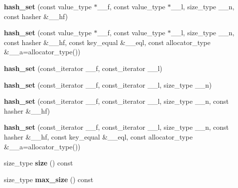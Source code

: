 \begin{DoxyCompactItemize}
\item 
\mbox{\label{classhash__set_a5e28025bf724a1af02e2f4b9348d1c4e}} 
{\bfseries hash\+\_\+set} (const value\+\_\+type $\ast$\+\_\+\+\_\+f, const value\+\_\+type $\ast$\+\_\+\+\_\+l, size\+\_\+type \+\_\+\+\_\+n, const hasher \&\+\_\+\+\_\+hf)
\item 
\mbox{\label{classhash__set_a65200147c735dbfc21f7fb7b86553bed}} 
{\bfseries hash\+\_\+set} (const value\+\_\+type $\ast$\+\_\+\+\_\+f, const value\+\_\+type $\ast$\+\_\+\+\_\+l, size\+\_\+type \+\_\+\+\_\+n, const hasher \&\+\_\+\+\_\+hf, const key\+\_\+equal \&\+\_\+\+\_\+eql, const allocator\+\_\+type \&\+\_\+\+\_\+a=allocator\+\_\+type())
\item 
\mbox{\label{classhash__set_a91334b397bb91f2152d61086f0ff166e}} 
{\bfseries hash\+\_\+set} (const\+\_\+iterator \+\_\+\+\_\+f, const\+\_\+iterator \+\_\+\+\_\+l)
\item 
\mbox{\label{classhash__set_a884b4e744419ab7c74bc41d1fe57ed64}} 
{\bfseries hash\+\_\+set} (const\+\_\+iterator \+\_\+\+\_\+f, const\+\_\+iterator \+\_\+\+\_\+l, size\+\_\+type \+\_\+\+\_\+n)
\item 
\mbox{\label{classhash__set_a0859d503d48b2decbc139c71339613b8}} 
{\bfseries hash\+\_\+set} (const\+\_\+iterator \+\_\+\+\_\+f, const\+\_\+iterator \+\_\+\+\_\+l, size\+\_\+type \+\_\+\+\_\+n, const hasher \&\+\_\+\+\_\+hf)
\item 
\mbox{\label{classhash__set_a98ea1f057f6d8f271a05eabf94c0e994}} 
{\bfseries hash\+\_\+set} (const\+\_\+iterator \+\_\+\+\_\+f, const\+\_\+iterator \+\_\+\+\_\+l, size\+\_\+type \+\_\+\+\_\+n, const hasher \&\+\_\+\+\_\+hf, const key\+\_\+equal \&\+\_\+\+\_\+eql, const allocator\+\_\+type \&\+\_\+\+\_\+a=allocator\+\_\+type())
\item 
\mbox{\label{classhash__set_a0a940b9fc465b305500c9e11fdd225cb}} 
size\+\_\+type {\bfseries size} () const
\item 
\mbox{\label{classhash__set_a6a97fb174686f83e08a69e9f1a4aede3}} 
size\+\_\+type {\bfseries max\+\_\+size} () const
\item 

\end{DoxyCompactItemize}

